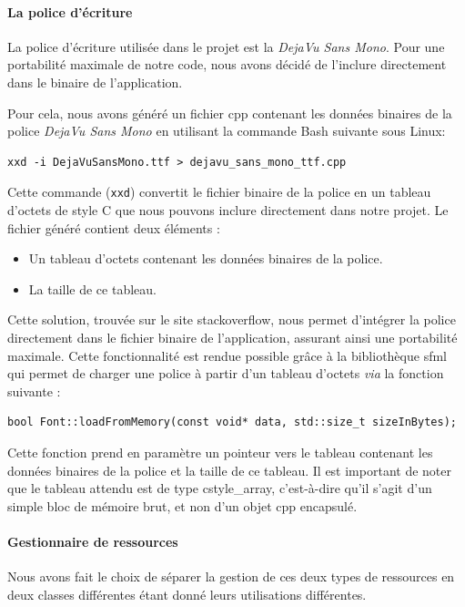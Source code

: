 \paragraph{La police d'écriture}
La police d'écriture utilisée dans le projet est la \textit{DejaVu Sans Mono}.
Pour une portabilité maximale de notre code, nous avons décidé de l'inclure directement dans le binaire de l'application.

Pour cela, nous avons généré un fichier \gls{cpp} contenant les données binaires de la police \textit{DejaVu Sans Mono} en utilisant la commande Bash suivante sous Linux:
\begin{lstlisting}[style=BashStyle,label={lst:generation_dejavusansmonottf_h}]
xxd -i DejaVuSansMono.ttf > dejavu_sans_mono_ttf.cpp
\end{lstlisting}
Cette commande (\texttt{\gls{xxd}}) convertit le fichier binaire de la police en un tableau d'octets de style C que nous pouvons inclure directement dans notre projet.
Le fichier généré contient deux éléments :
\begin{itemize}
    \item Un tableau d'octets contenant les données binaires de la police.
    \item La taille de ce tableau.
\end{itemize}

Cette solution, trouvée sur le site \gls{stackoverflow}\cite{stackoverflow_embed_font}, nous permet d'intégrer la police directement dans le fichier binaire de l'application, assurant ainsi une portabilité maximale.
Cette fonctionnalité est rendue possible grâce à la bibliothèque \gls{sfml} qui permet de charger une police à partir d'un tableau d'octets \textit{via} la fonction suivante :

\begin{lstlisting}[style=CStyle,label={lst:load_from_memory}]
bool Font::loadFromMemory(const void* data, std::size_t sizeInBytes);
\end{lstlisting}

Cette fonction prend en paramètre un pointeur vers le tableau contenant les données binaires de la police et la taille de ce tableau.
Il est important de noter que le tableau attendu est de type \gls{cstyle_array}, c'est-à-dire qu'il s'agit d'un simple bloc de mémoire brut, et non d'un objet \gls{cpp} encapsulé.

\paragraph{Gestionnaire de ressources}
Nous avons fait le choix de séparer la gestion de ces deux types de ressources en deux classes différentes étant donné leurs utilisations différentes.


